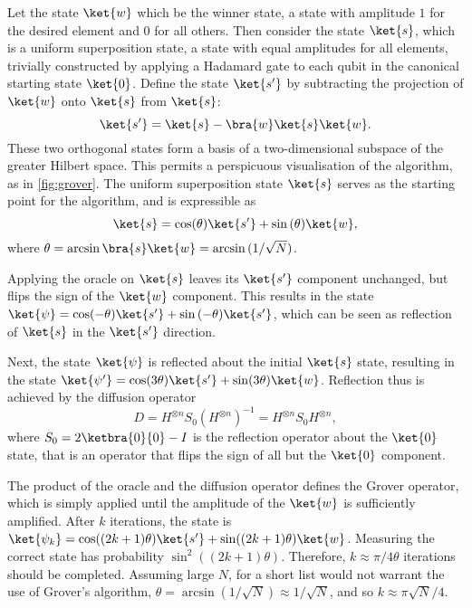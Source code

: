 Let the state $\ket{w}$ which be the winner state, a state with amplitude $1$ for the desired element and $0$ for all others.
Then consider the state $\ket{s}$, which is a uniform superposition state, a state with equal amplitudes for all elements, trivially constructed by applying a Hadamard gate to each qubit in the canonical starting state $\ket{0}$.
Define the state $\ket{s'}$ by subtracting the projection of $\ket{w}$ onto $\ket{s}$ from $\ket{s}$:
\begin{equation}
    \label{eq:grover_s'}
    \ket{s'} = \ket{s} - \bra{w}\ket{s}\ket{w}.
\end{equation}
These two orthogonal states form a basis of a two-dimensional subspace of the greater Hilbert space.
This permits a perspicuous visualisation of the algorithm, as in \cref{fig:grover}.
The uniform superposition state $\ket{s}$ serves as the starting point for the algorithm, and is expressible as
\begin{equation}
    \ket{s} = \cos(\theta)\ket{s'} + \sin{(\theta)}\ket{w},
\end{equation}
where $\theta=\arcsin\bra{s}\ket{w}=\arcsin{}(1/\sqrt{N})$.

Applying the oracle on $\ket{s}$ leaves its $\ket{s'}$ component unchanged, but flips the sign of the $\ket{w}$ component.
This results in the state $\ket{\psi} = \cos(-\theta)\ket{s'} + \sin{(-\theta)}\ket{s'}$, which can be seen as reflection of $\ket{s}$ in the $\ket{s'}$ direction.


Next, the state $\ket{\psi}$ is reflected about the initial $\ket{s}$ state, resulting in the state $\ket{\psi'} = \cos(3\theta)\ket{s'} + \sin(3\theta)\ket{w}$.
Reflection thus is achieved by the diffusion operator
\begin{equation}
    D=H^{\otimes n} S_0 (H^{\otimes n})^{-1} = H^{\otimes n} S_0 H^{\otimes n},
\end{equation}
where $S_0= 2\ketbra{0}{0} - I$ is the reflection operator about the $\ket{0}$ state, that is an operator that flips the sign of all but the $\ket{0}$ component.

The product of the oracle and the diffusion operator defines the Grover operator, which is simply applied until the amplitude of the  $\ket{w}$ is sufficiently amplified.
After $k$ iterations, the state is $\ket{\psi_k} = \cos((2k+1)\theta)\ket{s'} + \sin((2k+1)\theta)\ket{w}$.
Measuring the correct state has probability $\sin^2((2k+1)\theta)$.
Therefore, $k \approx {\pi}/{4\theta}$ iterations should be completed.
Assuming large $N$, for a short list would not warrant the use of Grover's algorithm, $\theta = \arcsin{({1}/{\sqrt{N}})} \approx 1/\sqrt{N}$, and so $k \approx \pi\sqrt{N}/4$.

